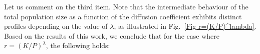 \documentclass[11pt]{article}
\theoremstyle{definition}
\theoremstyle{remark}
\begin{document}
Let us comment on the third item. Note that the intermediate behaviour of the total population size as a function of the diffusion coefficient exhibits distinct profiles depending on the value of $\lambda$, as illustrated in Fig.~\ref{Fig r=(K/P)^lambda}. Based on the results of this work, we conclude that for the case where $r=(K/P)^{\lambda}$, the following holds:


\end{document}
